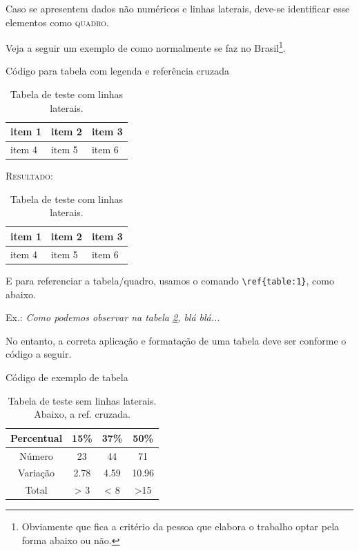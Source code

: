 \documentclass[a4paper,12pt,oneside,openright,extrafontsizes,openbib]{memoir}
\begin{document}
{Caso se apresentem dados não numéricos e linhas laterais, deve-se identificar esse elementos como \textsc{quadro}.

Veja a seguir um exemplo de como normalmente se faz no Brasil\footnote{Obviamente que fica a critério da pessoa que elabora o trabalho optar pela forma abaixo ou não.}.

\begin{codex}{Código para tabela com legenda e referência cruzada}
\begin{table}[h!]
	\begin{center}
	\begin{tabularx}{0.8\textwidth} { 
	| >{\centering\arraybackslash}X 
	| >{\centering\arraybackslash}X 
	| >{\centering\arraybackslash}X | }
	\hline
	item 1 & item 2 & item 3 \\
	\hline
	item 4  & item 5  & item 6  \\
	\hline
	\end{tabularx}
	\caption{Tabela de teste com linhas laterais.}
	\label{table:1}
	\end{center}
	\end{table}
\end{codex}

\textsc{Resultado:}

\begin{table}[h!]
	\begin{center}
		\begin{tabularx}{0.8\textwidth} { 
				| >{\centering\arraybackslash}X 
				| >{\centering\arraybackslash}X 
				| >{\centering\arraybackslash}X | }
			\hline
			item 1 & item 2 & item 3 \\
			\hline
			item 4  & item 5  & item 6  \\
			\hline
		\end{tabularx}
		\caption{Tabela de teste com linhas laterais.}
		\label{table:1}
	\end{center}
\end{table}

E para referenciar a tabela/quadro, usamos o comando \verb|\ref{table:1}|, como abaixo.

Ex.: \textit{Como podemos observar na tabela \ref{table:1}, blá blá...}

No entanto, a correta aplicação e formatação de uma tabela deve ser conforme o código a seguir.

\begin{codex}{Código de exemplo de tabela}
	\begin{table}[h!]
	\begin{center}
	\begin{tabular}{c|c|c|c}
	\hline
	Percentual & 15\% & 37\% & 50\% \\
	\hline
	Número & 23 & 44 & 71 \\
	\hline
	Variação & 2.78 & 4.59 & 10.96 \\
	\hline
	Total & > 3 & < 8 & >15  \\
	\hline
	\end{tabular}
	\caption{Tabela de teste sem linhas laterais. Abaixo, a ref. cruzada.}
	\label{table:2}
	\end{center}
	\end{table}
\end{codex}

}
\end{document}
